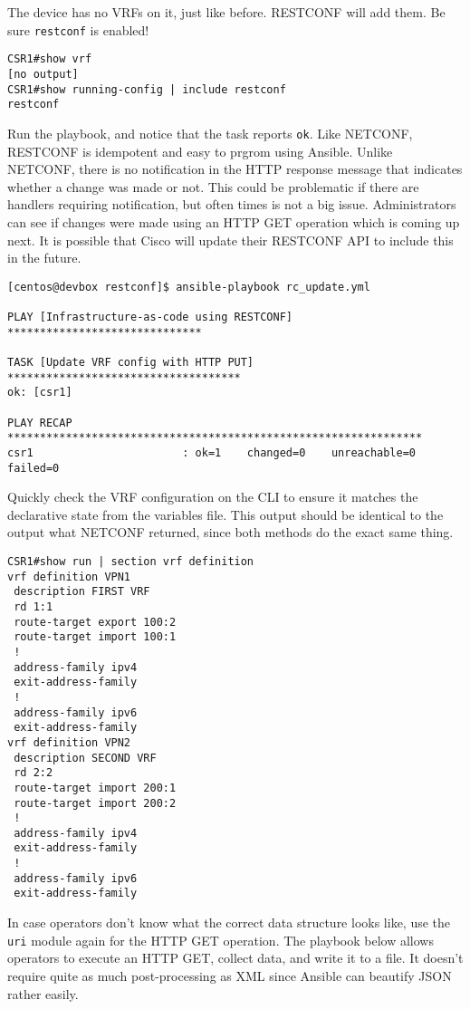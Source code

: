 The device has no VRFs on it, just like before. RESTCONF will add them.
Be sure \verb|restconf| is enabled!

\begin{verbatim}
CSR1#show vrf
[no output]
CSR1#show running-config | include restconf
restconf
\end{verbatim}

Run the playbook, and notice that the task reports \verb|ok|. Like NETCONF,
RESTCONF is idempotent and easy to prgrom using Ansible. Unlike NETCONF,
there is no notification in the HTTP response message that indicates whether
a change was made or not. This could be problematic if there are handlers
requiring notification, but often times is not a big issue. Administrators can
see if changes were made using an HTTP GET operation which is coming up next.
It is possible that Cisco will update their RESTCONF API to include this
in the future.

\begin{verbatim}
[centos@devbox restconf]$ ansible-playbook rc_update.yml

PLAY [Infrastructure-as-code using RESTCONF] ******************************

TASK [Update VRF config with HTTP PUT] ************************************
ok: [csr1]

PLAY RECAP ****************************************************************
csr1                       : ok=1    changed=0    unreachable=0    failed=0
\end{verbatim}

Quickly check the VRF configuration on the CLI to ensure it matches
the declarative state from the variables file. This output should be
identical to the output what NETCONF returned, since both methods
do the exact same thing.

\begin{verbatim}
CSR1#show run | section vrf definition
vrf definition VPN1
 description FIRST VRF
 rd 1:1
 route-target export 100:2
 route-target import 100:1
 !
 address-family ipv4
 exit-address-family
 !
 address-family ipv6
 exit-address-family
vrf definition VPN2
 description SECOND VRF
 rd 2:2
 route-target import 200:1
 route-target import 200:2
 !
 address-family ipv4
 exit-address-family
 !
 address-family ipv6
 exit-address-family
\end{verbatim}

In case operators don't know what the correct data structure looks like,
use the \verb|uri| module again for the HTTP GET operation. The playbook
below allows operators to execute an HTTP GET, collect data, and write it
to a file. It doesn't require quite as much post-processing as XML since
Ansible can beautify JSON rather easily.

